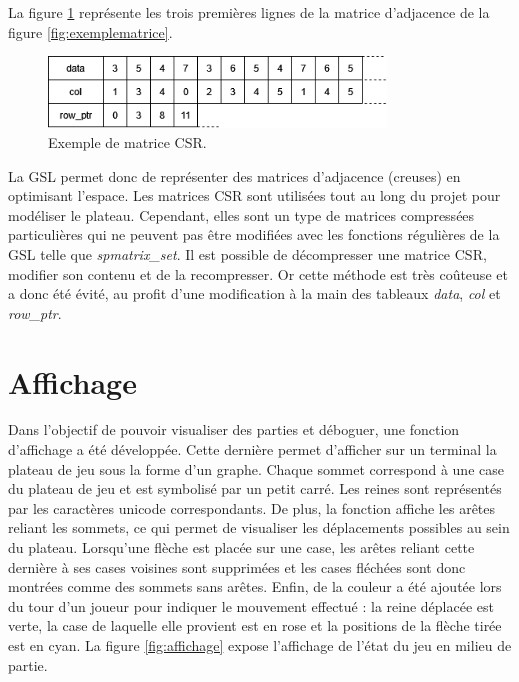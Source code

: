 \documentclass[a4paper]{article}
\begin{document}
La figure \ref{fig:csr} représente les trois premières lignes de la matrice d'adjacence de la figure \ref{fig:exemplematrice}.

\begin{figure}
    \centering
    \includegraphics[width=0.8\textwidth]{csr.png}
    \caption{Exemple de matrice CSR.}
    \label{fig:csr}
\end{figure}

La GSL permet donc de représenter des matrices d'adjacence (creuses) en optimisant l'espace. Les matrices CSR sont utilisées tout au long du projet pour modéliser le plateau. Cependant, elles sont un type de matrices compressées particulières qui ne peuvent pas être modifiées avec les fonctions régulières de la GSL telle que \emph{spmatrix\_set}. Il est possible de décompresser une matrice CSR, modifier son contenu et de la recompresser. Or cette méthode est très coûteuse et a donc été évité, au profit d'une modification à la main des tableaux \emph{data}, \emph{col} et \emph{row\_ptr}.



\section{Affichage}

Dans l'objectif de pouvoir visualiser des parties et déboguer, une fonction d'affichage a été développée. Cette dernière permet d'afficher sur un terminal la plateau de jeu sous la forme d'un graphe. Chaque sommet correspond à une case du plateau de jeu et est symbolisé par un petit carré. Les reines sont représentés par les caractères unicode correspondants. De plus, la fonction affiche les arêtes reliant les sommets, ce qui permet de visualiser les déplacements possibles au sein du plateau. Lorsqu'une flèche est placée sur une case, les arêtes reliant cette dernière à ses cases voisines sont supprimées et les cases fléchées sont donc montrées comme des sommets sans arêtes. Enfin, de la couleur a été ajoutée lors du tour d'un joueur pour indiquer le mouvement effectué : la reine déplacée est verte, la case de laquelle elle provient est en rose et la positions de la flèche tirée est en cyan. La figure \ref{fig:affichage} expose l'affichage de l'état du jeu en milieu de partie.
\end{document}
